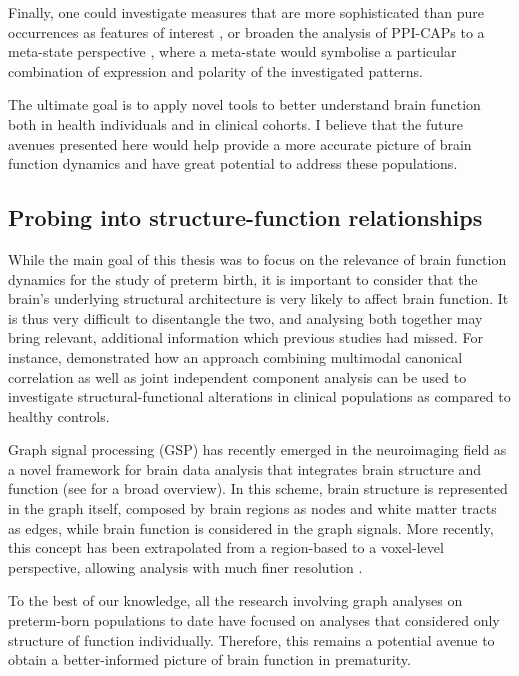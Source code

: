 Finally, one could investigate measures that are more sophisticated than pure occurrences as features of interest \citep{Chen2015, Bolton2020}, or broaden the analysis of PPI-CAPs to a meta-state perspective \citep{Miller2016,Vidaurre2017}, where a meta-state would symbolise a particular combination of expression and polarity of the investigated patterns.

The ultimate goal is to apply novel tools to better understand brain function both in health individuals and in clinical cohorts. I believe that the future avenues presented here would help provide a more accurate picture of brain function dynamics and have great potential to address these populations.


\subsection*{Probing into structure-function relationships}
While the main goal of this thesis was to focus on the relevance of brain function dynamics for the study of preterm birth, it is important to consider that the brain's underlying structural architecture is very likely to affect brain function. It is thus very difficult to disentangle the two, and analysing both together may bring relevant, additional information which previous studies had missed. For instance, \citet{Amico2018} demonstrated how an approach combining multimodal canonical correlation as well as joint independent component analysis can be used to investigate structural-functional alterations in clinical populations as compared to healthy controls.

Graph signal processing (GSP) has recently emerged in the neuroimaging field as a novel framework for brain data analysis that integrates brain structure and function (see \citet{Huang2018} for a broad overview). In this scheme, brain structure is represented in the graph itself, composed by brain regions as nodes and white matter tracts as edges, while brain function is considered in the graph signals. More recently, this concept has been extrapolated from a region-based to a voxel-level perspective, allowing analysis with much finer resolution \citep{Tarun2020}.

To the best of our knowledge, all the research involving graph analyses on preterm-born populations to date have focused on analyses that considered only structure of function individually. Therefore, this remains a potential avenue to obtain a better-informed picture of brain function in prematurity.


